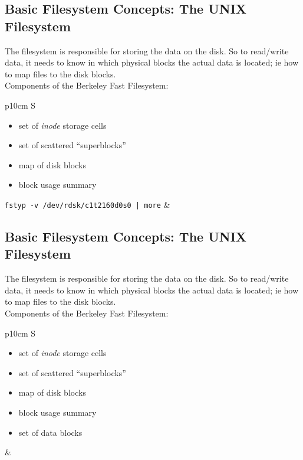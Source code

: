 \documentclass[xga]{xdvislides}
\begin{document}
\subsection{Basic Filesystem Concepts: The UNIX Filesystem}
The filesystem is responsible for storing the data on the disk.
So to read/write data, it needs to know in which physical blocks the actual
data is located; ie how to map files to the disk blocks.
\\

Components of the Berkeley Fast Filesystem:
\\

\begin{tabular}{ p{10cm} S }
\begin{itemize}
	\item set of {\em inode} storage cells
	\item set of scattered ``superblocks''
	\item map of disk blocks
	\item block usage summary
\end{itemize}
{\tt fstyp -v /dev/rdsk/c1t2160d0s0  | more}
&  \\
\end{tabular}

\subsection{Basic Filesystem Concepts: The UNIX Filesystem}
The filesystem is responsible for storing the data on the disk.
So to read/write data, it needs to know in which physical blocks the actual
data is located; ie how to map files to the disk blocks.
\\

Components of the Berkeley Fast Filesystem:
\\

\begin{tabular}{ p{10cm} S }
\begin{itemize}
	\item set of {\em inode} storage cells
	\item set of scattered ``superblocks''
	\item map of disk blocks
	\item block usage summary
	\item set of data blocks
\end{itemize}
&  \\
\end{tabular}
\end{document}
